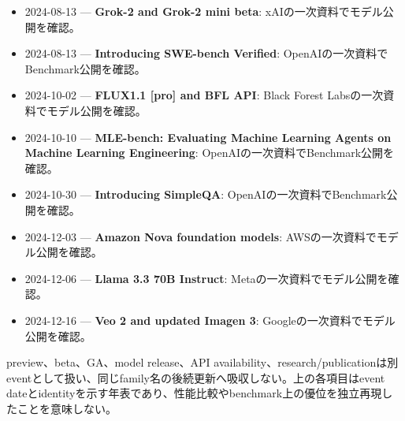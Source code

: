 \begin{itemize}[leftmargin=1.5em,itemsep=0.45em]
\item 2024-08-13 — \textbf{Grok-2 and Grok-2 mini beta}: xAIの一次資料でモデル公開を確認。 \autocite{src-1572648d0de9}
\item 2024-08-13 — \textbf{Introducing SWE-bench Verified}: OpenAIの一次資料でBenchmark公開を確認。 \autocite{src-10b59b402b80}
\item 2024-10-02 — \textbf{FLUX1.1 [pro] and BFL API}: Black Forest Labsの一次資料でモデル公開を確認。 \autocite{src-99e6401ec31b}
\item 2024-10-10 — \textbf{MLE-bench: Evaluating Machine Learning Agents on Machine Learning Engineering}: OpenAIの一次資料でBenchmark公開を確認。 \autocite{src-c3a08c57269d}
\item 2024-10-30 — \textbf{Introducing SimpleQA}: OpenAIの一次資料でBenchmark公開を確認。 \autocite{src-e92e95daf8e0}
\item 2024-12-03 — \textbf{Amazon Nova foundation models}: AWSの一次資料でモデル公開を確認。 \autocite{src-5db07766b472}
\item 2024-12-06 — \textbf{Llama 3.3 70B Instruct}: Metaの一次資料でモデル公開を確認。 \autocite{src-6bbe9721db06}
\item 2024-12-16 — \textbf{Veo 2 and updated Imagen 3}: Googleの一次資料でモデル公開を確認。 \autocite{src-bc9a95ff1e00}
\end{itemize}

preview、beta、GA、model release、API availability、research/publicationは別eventとして扱い、同じfamily名の後続更新へ吸収しない。上の各項目はevent dateとidentityを示す年表であり、性能比較やbenchmark上の優位を独立再現したことを意味しない。
